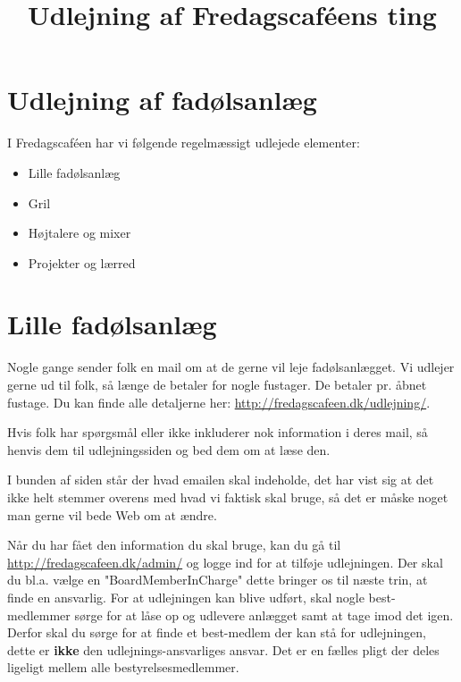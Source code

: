 

\title{Udlejning af Fredagscaféens ting}



\maketitle

\section{Udlejning af fadølsanlæg}

I Fredagscaféen har vi følgende regelmæssigt udlejede elementer:
\begin{itemize}
	\item Lille fadølsanlæg
	\item Gril
	\item Højtalere og mixer
	\item Projekter og lærred
\end{itemize}

\section{Lille fadølsanlæg}
Nogle gange sender folk en mail om at de gerne vil leje fadølsanlægget. Vi udlejer gerne ud til folk, så længe de betaler for nogle fustager. De betaler pr. åbnet fustage. Du kan finde alle detaljerne her: \url{http://fredagscafeen.dk/udlejning/}.

Hvis folk har spørgsmål eller ikke inkluderer nok information i deres mail, så henvis dem til udlejningssiden og bed dem om at læse den.

I bunden af siden står der hvad emailen skal indeholde, det har vist sig at det ikke helt stemmer overens med hvad vi faktisk skal bruge, så det er måske noget man gerne vil bede Web om at ændre.

Når du har fået den information du skal bruge, kan du gå til \url{http://fredagscafeen.dk/admin/} og logge ind for at tilføje udlejningen. Der skal du bl.a. vælge en "BoardMemberInCharge" dette bringer os til næste trin, at finde en ansvarlig. For at udlejningen kan blive udført, skal nogle best-medlemmer sørge for at låse op og udlevere anlægget samt at tage imod det igen. Derfor skal du sørge for at finde et best-medlem der kan stå for udlejningen, dette er \textbf{ikke} den udlejnings-ansvarliges ansvar. Det er en fælles pligt der deles ligeligt mellem alle bestyrelsesmedlemmer.


